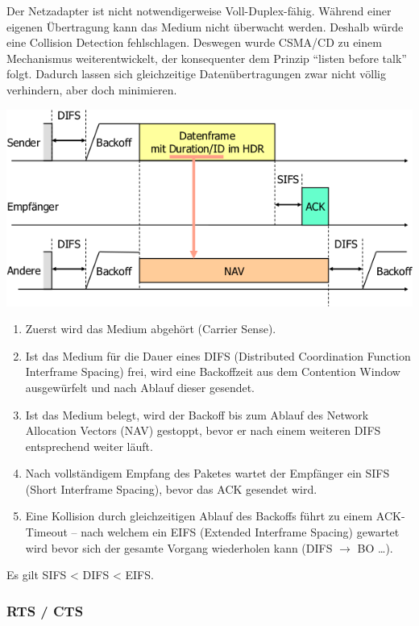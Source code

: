 Der Netzadapter ist nicht notwendigerweise Voll-Duplex-fähig. Während einer
eigenen Übertragung kann das Medium nicht überwacht werden. Deshalb würde eine
Collision Detection fehlschlagen. Deswegen wurde CSMA/CD zu einem Mechanismus
weiterentwickelt, der konsequenter dem Prinzip ``listen before talk'' folgt.
Dadurch lassen sich gleichzeitige Datenübertragungen zwar nicht völlig
verhindern, aber doch minimieren.

\begin{center}
	\includegraphics[width=.8\textwidth]{media/csma_ca.png}
\end{center}

\begin{enumerate}
	\item Zuerst wird das Medium abgehört (Carrier Sense).
	\item Ist das Medium für die Dauer eines DIFS (Distributed Coordination
		Function Interframe Spacing) frei, wird eine Backoffzeit aus dem Contention
		Window ausgewürfelt und nach Ablauf dieser gesendet.
	\item Ist das Medium belegt, wird der Backoff bis zum Ablauf des Network
		Allocation Vectors (NAV) gestoppt, bevor er nach einem weiteren DIFS
		entsprechend weiter läuft.
	\item Nach vollständigem Empfang des Paketes wartet der Empfänger ein SIFS
		(Short Interframe Spacing), bevor das ACK gesendet wird.
	\item Eine Kollision durch gleichzeitigen Ablauf des Backoffs führt zu einem
		ACK-Timeout -- nach welchem ein EIFS (Extended Interframe Spacing) gewartet
		wird bevor sich der gesamte Vorgang wiederholen kann (DIFS $\rightarrow$ BO
		\ldots).
\end{enumerate}

Es gilt SIFS < DIFS < EIFS.


\subsubsection{RTS / CTS}

